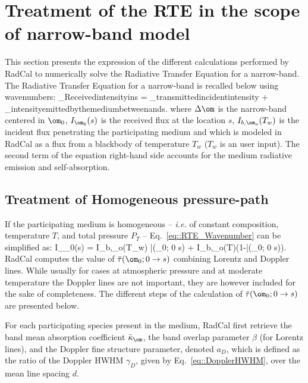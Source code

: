 \section{Treatment of the RTE in the scope of narrow-band model}\label{sec:RTE_NB}
This section presents the expression of the different calculations performed by RadCal to numerically solve the Radiative Transfer Equation for a narrow-band. The Radiative Transfer Equation for a narrow-band is recalled below using wavenumbers:
\be\label{eq::RTE_Wavenumber}
_{\rm Received\:intensity\:in\:s}  = _{\rm transmitted\:incident\:intensity} + _{\rm intensity\:emitted\:by\:the\:medium\:between\:and\:s}.
\ee
where $\Delta \om$ is the narrow-band centered in $\om_0$, $I_{\om_0}(s)$ is the received flux at the location $s$, $I_{b,\om_o}(T_w)$ is the incident flux penetrating the participating medium and which is modeled in RadCal as a flux from a blackbody of temperature $T_w$ ($T_w$ is an user input). The second term of the equation right-hand side accounts for the medium radiative emission and self-absorption.

\subsection{Treatment of Homogeneous pressure-path}
\label{sec::homogeneous_path}
If the participating medium is homogeneous -- \textit{i.e.} of constant composition, temperature $T$, and total pressure $P_T$ -- Eq.~\ref{eq::RTE_Wavenumber} can be simplified as:
\be\label{eq::RTE_wavenumber_H}
I_{\om_0}(s) = I_{\rm b,\om_o}(T_w) \bar{\tau}(\om_0; 0 \rightarrow s) + I_{\rm b,\om_o}(T)(1-\bar{\tau}(\om_0; 0 \rightarrow s)).
\ee
RadCal computes the value of $\bar{\tau}(\om_0; 0 \rightarrow s)$ combining Lorentz and Doppler lines. While usually for cases at atmospheric pressure and at moderate temperature the Doppler lines are not important, they are however included for the sake of completeness. The different steps of the calculation of $\bar{\tau}(\om_0; 0 \rightarrow s)$ are presented below.

For each participating species present in the medium, RadCal first retrieve the band mean absorption coefficient $\bar{\kappa}_{\om}$, the band overlap parameter $\beta$ (for Lorentz lines), and the Doppler fine structure parameter, denoted $a_D$, which is defined as the ratio of the Doppler HWHM $\gamma_D$, given by Eq.~\ref{eq::DopplerHWHM}, over the mean line spacing $d$.

